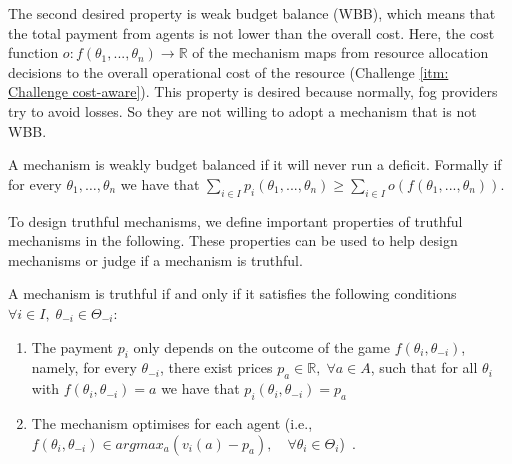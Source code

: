 \documentclass[11pt]{phdthesis}
\begin{document}

The second desired property is weak budget balance (WBB), which means that the total payment from agents is not lower than the overall cost. Here, the cost function $ o: f(\theta_1,...,\theta_n) \rightarrow \mathbb{R} $ of the mechanism maps from resource allocation decisions to the overall operational cost of the resource (Challenge \ref{itm: Challenge cost-aware}). This property is desired because normally, fog providers try to avoid losses. So they are not willing to adopt a mechanism that is not WBB. 

\begin{definition}
    A mechanism is weakly budget balanced if it will never run a deficit. Formally if for every $ \theta_1,\ldots, \theta_n $ we have that $ \sum_{i \in I} p_i(\theta_1,...,\theta_n) \geq \sum_{i \in I} o(f(\theta_1,...,\theta_n)) $. 
\end{definition}


To design truthful mechanisms, we define important properties of truthful mechanisms in the following. These properties can be used to help design mechanisms or judge if a mechanism is truthful. 
\begin{proposition}
    A mechanism is truthful if and only if it satisfies the following conditions $\forall i \in I,\; \theta_{-i} \in \Theta_{-i}$:
    \begin{enumerate}
        \item The payment $p_i$ only depends on the outcome of the game $f(\theta_i, \theta_{-i})$, namely, for every $\theta_{-i}$, there exist prices $p_a \in \mathbb{R}, \; \forall a \in A$, such that for all $\theta_i$ with $f(\theta_i, \theta_{-i})=a$ we have that $p_i(\theta_i,\theta_{-i}) = p_a$
        \item The mechanism optimises for each agent (i.e., $f(\theta_i, \theta_{-i}) \in argmax_a(v_i(a) - p_a), \quad \forall \theta_i \in \Theta_{i}$)~\citep[Proposition 9.27]{nisan2007algorithmic}. 
    \end{enumerate}
\end{proposition}
\end{document}
